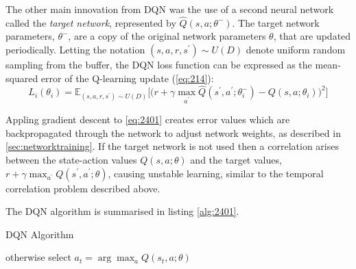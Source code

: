 The other main innovation from DQN was the use of a second neural network called the \textit{target network}, represented by $\hat{Q}(s,a;\theta^-)$. The target network parameters, $\theta^-$, are a copy of the original network parameters $\theta$, that are updated periodically. Letting the notation $(s,a,r,s^\prime) \sim U(D)$ denote uniform random sampling from the buffer, the DQN loss function can be expressed as the mean-squared error of the Q-learning update (\ref{eq:214}):
\begin{equation}
	L_i(\theta_i) = \mathbb{E}_{(s,a,r,s^\prime) \sim U(D)} \bigg[ \bigg( r + \gamma \max_{a^\prime} \hat{Q}(s^\prime, a^\prime; \theta_i^-) - Q(s, a; \theta_i) \bigg)^2 \bigg] \label{eq:2401}
\end{equation}

Appling gradient descent to \ref{eq:2401} creates error values which are backpropagated through the network to adjust network weights, as described in \textsection \ref{sec:networktraining}. If the target network is not used then a correlation arises between the state-action values $Q(s,a; \theta)$ and the target values, $r + \gamma \max_{a^\prime} Q(s^\prime,a^\prime; \theta)$, causing unstable learning, similar to the temporal correlation problem described above.

The DQN algorithm is summarised in listing \ref{alg:2401}.

\begin{algorithm}[h]
	\caption{DQN Algorithm}
	\begin{algorithmic}[1]
				 otherwise select $a_t = \arg\max_a Q(s_t, a; \theta)$
			\EndFor
		\EndFor
	\end{algorithmic}\label{alg:2401}
\end{algorithm}


